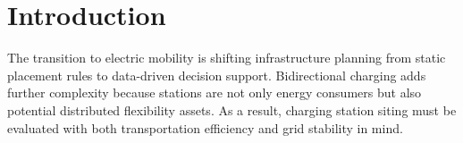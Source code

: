 \section{Introduction}
\label{sec:introduction}
The transition to electric mobility is shifting infrastructure planning from static placement rules to data-driven decision support. Bidirectional charging adds further complexity because stations are not only energy consumers but also potential distributed flexibility assets. As a result, charging station siting must be evaluated with both transportation efficiency and grid stability in mind.
